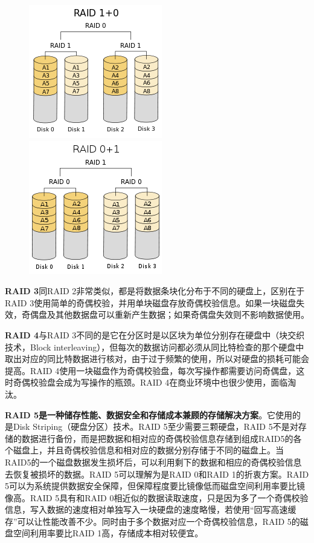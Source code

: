 \begin{figure}[ht]
	\begin{center}
		\includegraphics[keepaspectratio,width=0.2\paperwidth]{Pictures/RAID/RAID10.png}
		\includegraphics[keepaspectratio,width=0.2\paperwidth]{Pictures/RAID/RAID01.png}
	\end{center}
\end{figure}
\textbf{RAID 3}同RAID 2非常类似，都是将数据条块化分布于不同的硬盘上，区别在于RAID 3使用简单的奇偶校验，并用单块磁盘存放奇偶校验信息。如果一块磁盘失效，奇偶盘及其他数据盘可以重新产生数据；如果奇偶盘失效则不影响数据使用。


\textbf{RAID 4}与RAID 3不同的是它在分区时是以区块为单位分别存在硬盘中（块交织技术，Block interleaving），但每次的数据访问都必须从同比特检查的那个硬盘中取出对应的同比特数据进行核对，由于过于频繁的使用，所以对硬盘的损耗可能会提高。RAID 4使用一块磁盘作为奇偶校验盘，每次写操作都需要访问奇偶盘，这时奇偶校验盘会成为写操作的瓶颈。RAID 4在商业环境中也很少使用，面临淘汰。



\textbf{RAID 5是一种储存性能、数据安全和存储成本兼顾的存储解决方案}。它使用的是Disk Striping（硬盘分区）技术。RAID 5至少需要三颗硬盘，RAID 5不是对存储的数据进行备份，而是把数据和相对应的奇偶校验信息存储到组成RAID5的各个磁盘上，并且奇偶校验信息和相对应的数据分别存储于不同的磁盘上。当RAID5的一个磁盘数据发生损坏后，可以利用剩下的数据和相应的奇偶校验信息去恢复被损坏的数据。RAID 5可以理解为是RAID 0和RAID 1的折衷方案。RAID 5可以为系统提供数据安全保障，但保障程度要比镜像低而磁盘空间利用率要比镜像高。RAID 5具有和RAID 0相近似的数据读取速度，只是因为多了一个奇偶校验信息，写入数据的速度相对单独写入一块硬盘的速度略慢，若使用“回写高速缓存”可以让性能改善不少。同时由于多个数据对应一个奇偶校验信息，RAID 5的磁盘空间利用率要比RAID 1高，存储成本相对较便宜。


